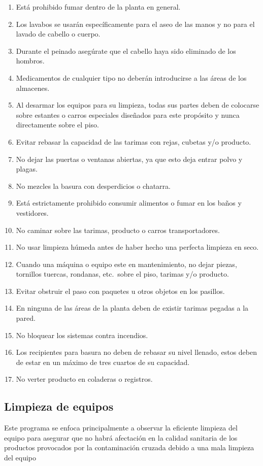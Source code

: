 \begin{enumerate}
	\item Está prohibido fumar dentro de la planta en general.
	\item Los lavabos se usarán específicamente para el aseo de las manos y no para el lavado de cabello o cuerpo.
	\item Durante el peinado asegúrate que el cabello haya sido eliminado de los hombros.
	\item Medicamentos de cualquier tipo no deberán introducirse a las áreas de los almacenes.
	\item Al desarmar los equipos para su limpieza, todas sus partes deben de colocarse sobre estantes o carros especiales diseñados para este propósito y nunca directamente sobre el piso.
	\item Evitar rebasar la capacidad de las tarimas con rejas, cubetas y/o producto.
	\item No dejar las puertas o ventanas abiertas, ya que esto deja entrar polvo y plagas.
	\item No mezcles la basura con desperdicios o chatarra.
	\item Está estrictamente prohibido consumir alimentos o fumar en los baños y vestidores.
	\item No caminar sobre las tarimas, producto o carros transportadores.
	\item No usar limpieza húmeda antes de haber hecho una perfecta limpieza en seco.
	\item Cuando una máquina o equipo este en mantenimiento, no dejar piezas, tornillos tuercas, rondanas, etc.\ sobre el piso, tarimas y/o producto.
	\item Evitar obstruir el paso con paquetes u otros objetos en los pasillos.
	\item En ninguna de las áreas de la planta deben de existir tarimas pegadas a la pared.
	\item No bloquear los sistemas contra incendios.
	\item Los recipientes para basura no deben de rebasar su nivel llenado, estos deben de estar en un máximo de tres cuartos de su capacidad.
	\item No verter producto en coladeras o registros.
\end{enumerate}

\subsection{Limpieza de equipos}
Este programa se enfoca principalmente a observar la eficiente limpieza del equipo para asegurar que no habrá afectación en la calidad sanitaria de los productos provocados por la contaminación cruzada debido a una mala limpieza del equipo

